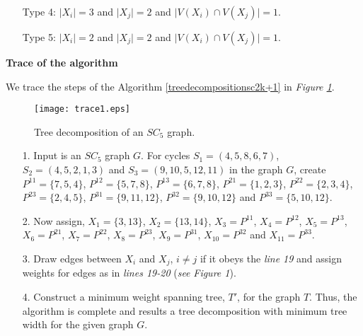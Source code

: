 \documentclass[runningheads]{llncs}
\begin{document}
\begin{algorithm}
\begin{algorithmic}[1]
{\begin{itemize}
\item[Type 4:] $\vert X_i \vert = 3$ and $\vert X_j \vert = 2$ and $\vert V(X_i) \cap V(X_j) \vert = 1$.
\item[Type 5:] $\vert X_i \vert = 2$ and $\vert X_j \vert = 2$ and $\vert V(X_i) \cap V(X_j) \vert = 1$.
\end{itemize}}
\end{algorithmic}
\label{treedecompositionsc2k+1}
\end{algorithm}

\vspace{0.4cm}

\noindent \textbf{{Trace of the algorithm}}
\vspace{0.3cm}

\noindent We trace the steps of the Algorithm \ref{treedecompositionsc2k+1} in \emph{Figure \ref{fig:tracetreedecompositionsc2k+1}}.


\begin{figure}[H]
\centering
\texttt{[image: trace1.eps]} 
\vspace{-0.1cm}
\caption{Tree decomposition of an $SC_5$ graph.}
\label{fig:tracetreedecompositionsc2k+1}
\end{figure}



\begin{itemize}
\item[1.] Input is an $SC_5$ graph $G$. For cycles $S_1=(4,5,8,6,7)$, $S_2=(4,5,2,1,3)$ and $S_3=(9,10,5,12,11)$ in the graph $G$, create $P^{11} = \{7,5,4\}$, $P^{12} = \{5,7,8\}$, $P^{13} = \{6,7,8\}$, $P^{21} = \{1,2,3\}$, $P^{22} = \{2,3,4\}$, $P^{23} = \{2,4,5\}$, $P^{31} = \{9,11,12\}$, $P^{32} = \{9,10,12\}$ and $P^{33} = \{5,10,12\}$.
\item[2.] Now assign, $X_1 = \{3,13\}$, $X_2 = \{13,14\}$, $X_3 = P^{11}$, $X_4 = P^{12}$, $X_5 = P^{13}$, $X_6 = P^{21}$, $X_7 = P^{22}$, $X_8 = P^{23}$, $X_9 = P^{31}$, $X_{10} = P^{32}$ and $X_{11} = P^{33}$.
\item[3.] Draw edges between $X_i$ and $X_j$, $i\neq j$ if it obeys the \emph{line 19} and assign weights for edges as in \emph{lines 19-20} (\emph{see} \emph{Figure 1}).
\item[4.] Construct a minimum weight spanning tree, $T'$, for the graph $T$. Thus, the algorithm is complete and results a tree decomposition with minimum tree width for the given graph $G$.
\end{itemize}
\end{document}
